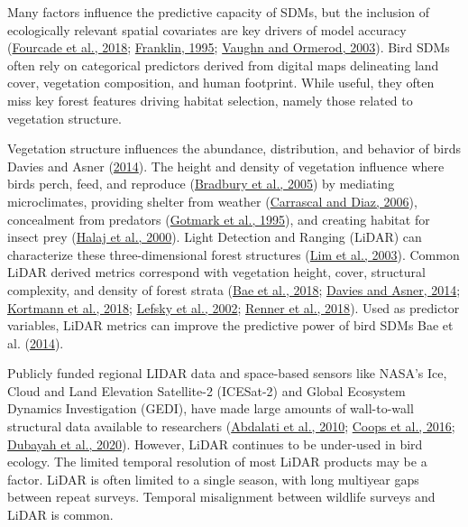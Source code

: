\documentclass[
]{article}
\begin{document}
Many factors influence the predictive capacity of SDMs, but the inclusion of ecologically relevant spatial covariates are key drivers of model accuracy (\protect\hyperlink{ref-fourcadePaintingsPredictDistribution2018}{Fourcade et al., 2018}; \protect\hyperlink{ref-Franklin1995}{Franklin, 1995}; \protect\hyperlink{ref-Vaughn2003}{Vaughn and Ormerod, 2003}). Bird SDMs often rely on categorical predictors derived from digital maps delineating land cover, vegetation composition, and human footprint. While useful, they often miss key forest features driving habitat selection, namely those related to vegetation structure.

Vegetation structure influences the abundance, distribution, and behavior of birds Davies and Asner (\protect\hyperlink{ref-Davies2014a}{2014}). The height and density of vegetation influence where birds perch, feed, and reproduce (\protect\hyperlink{ref-Bradbury2005}{Bradbury et al., 2005}) by mediating microclimates, providing shelter from weather (\protect\hyperlink{ref-CarrascalDiaz2006}{Carrascal and Diaz, 2006}), concealment from predators (\protect\hyperlink{ref-GotmarkBlomqvist1995}{Gotmark et al., 1995}), and creating habitat for insect prey (\protect\hyperlink{ref-halajImportanceHabitatStructure2000}{Halaj et al., 2000}). Light Detection and Ranging (LiDAR) can characterize these three-dimensional forest structures (\protect\hyperlink{ref-limLiDARRemoteSensing2003}{Lim et al., 2003}). Common LiDAR derived metrics correspond with vegetation height, cover, structural complexity, and density of forest strata (\protect\hyperlink{ref-Bae2018}{Bae et al., 2018}; \protect\hyperlink{ref-Davies2014a}{Davies and Asner, 2014}; \protect\hyperlink{ref-Kortmann2018}{Kortmann et al., 2018}; \protect\hyperlink{ref-Lefsky2002}{Lefsky et al., 2002}; \protect\hyperlink{ref-Renner2018}{Renner et al., 2018}). Used as predictor variables, LiDAR metrics can improve the predictive power of bird SDMs Bae et al. (\protect\hyperlink{ref-Bae2014}{2014}).

Publicly funded regional LIDAR data and space-based sensors like NASA's Ice, Cloud and Land Elevation Satellite-2 (ICESat-2) and Global Ecosystem Dynamics Investigation (GEDI), have made large amounts of wall-to-wall structural data available to researchers (\protect\hyperlink{ref-abdalatiICESat2LaserAltimetry2010}{Abdalati et al., 2010}; \protect\hyperlink{ref-coopsForestStructureHabitat2016}{Coops et al., 2016}; \protect\hyperlink{ref-dubayahGlobalEcosystemDynamics2020a}{Dubayah et al., 2020}). However, LiDAR continues to be under-used in bird ecology. The limited temporal resolution of most LiDAR products may be a factor. LiDAR is often limited to a single season, with long multiyear gaps between repeat surveys. Temporal misalignment between wildlife surveys and LiDAR is common.
\end{document}
